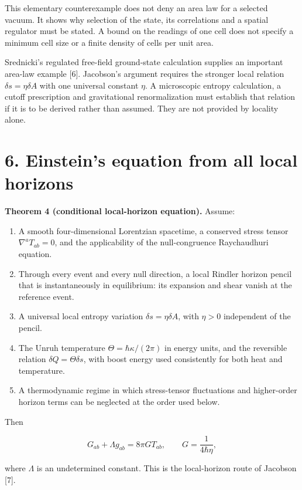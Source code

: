 \documentclass[
  11pt,
  a4paper,
]{article}
\providecommand{\tightlist}{%
  \setlength{\itemsep}{0pt}\setlength{\parskip}{0pt}}
\begin{document}
This elementary counterexample does not deny an area law for a selected vacuum. It shows why selection of the state, its correlations and a spatial regulator must be stated. A bound on the readings of one cell does not specify a minimum cell size or a finite density of cells per unit area.

Srednicki's regulated free-field ground-state calculation supplies an important area-law example {[}6{]}. Jacobson's argument requires the stronger local relation \(\delta s=\eta\delta A\) with one universal constant \(\eta\). A microscopic entropy calculation, a cutoff prescription and gravitational renormalization must establish that relation if it is to be derived rather than assumed. They are not provided by locality alone.

\section{6. Einstein's equation from all local horizons}\label{einsteins-equation-from-all-local-horizons}

\textbf{Theorem 4 (conditional local-horizon equation).} Assume:

\begin{enumerate}
\def\labelenumi{\arabic{enumi}.}
\tightlist
\item
  A smooth four-dimensional Lorentzian spacetime, a conserved stress tensor \(\nabla^aT_{ab}=0\), and the applicability of the null-congruence Raychaudhuri equation.
\item
  Through every event and every null direction, a local Rindler horizon pencil that is instantaneously in equilibrium: its expansion and shear vanish at the reference event.
\item
  A universal local entropy variation \(\delta s=\eta\delta A\), with \(\eta>0\) independent of the pencil.
\item
  The Unruh temperature \(\Theta=\hbar\kappa/(2\pi)\) in energy units, and the reversible relation \(\delta Q=\Theta\delta s\), with boost energy used consistently for both heat and temperature.
\item
  A thermodynamic regime in which stress-tensor fluctuations and higher-order horizon terms can be neglected at the order used below.
\end{enumerate}

Then

\[
G_{ab}+\Lambda g_{ab}=8\pi G T_{ab},
\qquad G=\frac1{4\hbar\eta},
\tag{6.1}
\]

where \(\Lambda\) is an undetermined constant. This is the local-horizon route of Jacobson {[}7{]}.
\end{document}
